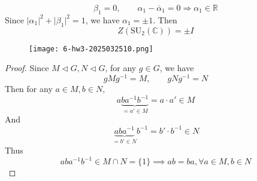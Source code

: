 \[
\beta_1=0,\qquad \alpha_1-\overline{\alpha}_{1}=0\Rightarrow\alpha_1\in \mathbb{R}
\]
Since $\lvert \alpha_1 \rvert ^2+\lvert \beta_1 \rvert ^2=1$, we have $\alpha_1=\pm1$. Then
\[
Z(\mathrm{SU}_{2}(\mathbb{C}))=\pm I
\]
\begin{exercise}
\begin{figure}[H]
\centering
\texttt{[image: 6-hw3-2025032510.png]}
\label{}
\end{figure}
\end{exercise}
\begin{proof}
Since $M\lhd G,N\lhd G$, for any $g\in G$, we have
\[
gMg^{-1}=M,\qquad gNg^{-1}=N
\]
Then for any $a\in M, b\in N$,
\[
a\underbrace{ ba^{-1}b^{-1} }_{ =a'\in M }=a\cdot a'\in M
\]
And
\[
\underbrace{ aba^{-1} }_{ =b'\in N }b^{-1}=b'\cdot b^{-1}\in N
\]
Thus
\[
aba^{-1}b^{-1}\in M\cap N=\{ 1 \}\implies ab=ba,\forall a\in M,b\in N
\]
\end{proof}
